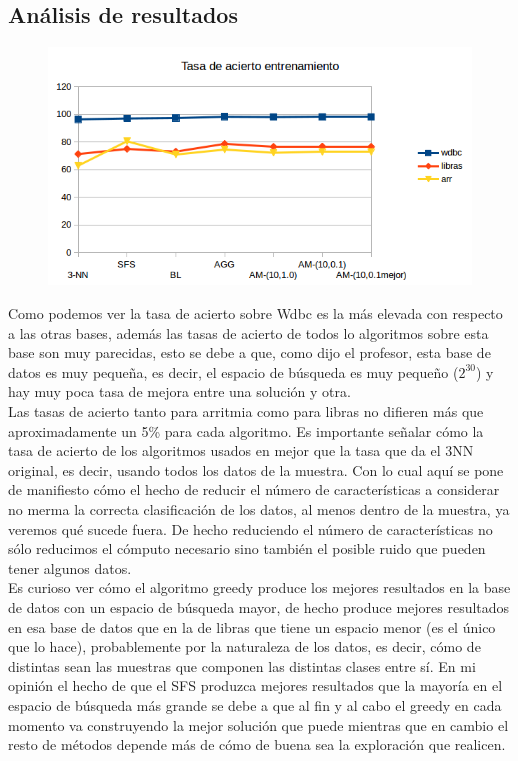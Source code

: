 \documentclass[10pt,a4paper]{article}
\begin{document}
\subsection{\color[rgb]{0.0,0.0,0.51}Análisis de resultados}


\begin{figure}[H]
\centering
\includegraphics[width=130mm]{tasa_train_am.png}
\end{figure}

Como podemos ver la tasa de acierto sobre Wdbc es la más elevada con respecto a las otras bases, además las tasas de acierto de todos lo algoritmos sobre esta base son muy parecidas, esto se debe a que, como dijo el profesor, esta base de datos es muy pequeña, es decir, el espacio de búsqueda es muy pequeño ($2^{30}$) y hay muy poca tasa de mejora entre una solución y otra.\\

Las tasas de acierto tanto para arritmia como para libras no difieren más que aproximadamente un 5\% para cada algoritmo. Es importante señalar cómo la tasa de acierto de los algoritmos usados en mejor que la tasa que da el 3NN original, es decir, usando todos los datos de la muestra. Con lo cual aquí se pone de manifiesto cómo el hecho de reducir el número de características a considerar no merma la correcta clasificación de los datos, al menos dentro de la muestra, ya veremos qué sucede fuera. De hecho reduciendo el número de características no sólo reducimos el cómputo necesario sino también el posible ruido que pueden tener algunos datos.\\

Es curioso ver cómo el algoritmo greedy produce los mejores resultados en la base de datos con un espacio de búsqueda mayor, de hecho produce mejores resultados en esa base de datos que en la de libras que tiene un espacio menor (es el único que lo hace), probablemente por la naturaleza de los datos, es decir, cómo de distintas sean las muestras que componen las distintas clases entre sí. En mi opinión el hecho de que el SFS produzca mejores resultados que la mayoría en el espacio de búsqueda más grande se debe a que al fin y al cabo el greedy en cada momento va construyendo la mejor solución que puede mientras que en cambio el resto de métodos depende más de cómo de buena sea la exploración que realicen.\\
\end{document}
